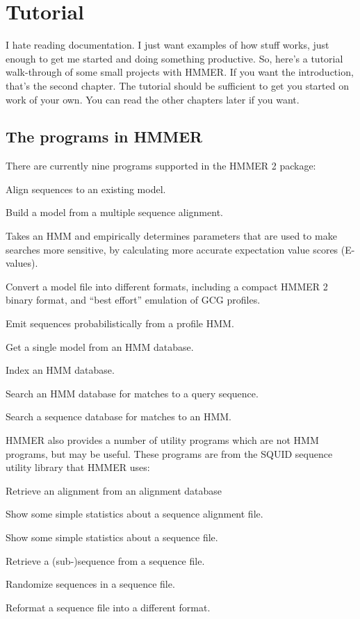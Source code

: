 \chapter{Tutorial}

I hate reading documentation. I just want examples of how stuff works,
just enough to get me started and doing something productive. So,
here's a tutorial walk-through of some small projects with HMMER. If
you want the introduction, that's the second chapter. The tutorial
should be sufficient to get you started on work of your own. You can
read the other chapters later if you want.

\section {The programs in HMMER}

There are currently nine programs supported in the HMMER 2 package:

\begin{wideitem}
\item[\emprog{hmmalign}] Align sequences to an existing model.
\item[\emprog{hmmbuild}] Build a model from a multiple sequence alignment.
\item[\emprog{hmmcalibrate}] Takes an HMM and empirically determines
parameters that are used to make searches more sensitive, by
calculating more accurate expectation value scores (E-values).
\item[\emprog{hmmconvert}] Convert a model file into different formats,
including a compact HMMER 2 binary format, and ``best effort''
emulation of GCG profiles.
\item[\emprog{hmmemit}] Emit sequences probabilistically from a profile HMM.
\item[\emprog{hmmfetch}] Get a single model from an HMM database.
\item[\emprog{hmmindex}] Index an HMM database.
\item[\emprog{hmmpfam}] Search an HMM database for matches to a query sequence.
\item[\emprog{hmmsearch}] Search a sequence database for matches to an HMM.
\end{wideitem}

HMMER also provides a number of utility programs which are not HMM
programs, but may be useful. These programs are from the SQUID
sequence utility library that HMMER uses:

\begin{wideitem}
\item[\emprog{afetch}] Retrieve an alignment from an alignment database
\item[\emprog{alistat}] Show some simple statistics about a sequence
alignment file.
\item[\emprog{seqstat}] Show some simple statistics about a sequence file.
\item[\emprog{sfetch}] Retrieve a (sub-)sequence from a sequence file.
\item[\emprog{shuffle}] Randomize sequences in a sequence file.
\item[\emprog{sreformat}] Reformat a sequence file into a different format.
\end{wideitem}

